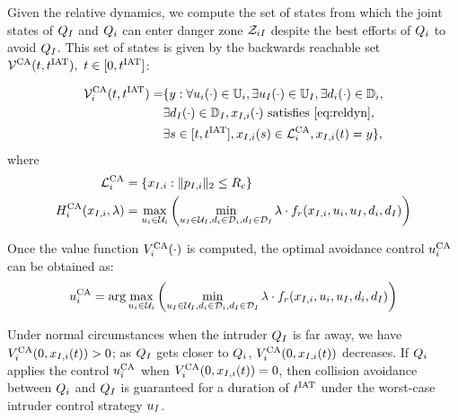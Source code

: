 Given the relative dynamics, we compute the set of states from which the joint states of $Q_{I}$ and $Q_i$ can enter danger zone $\mathcal{Z}_{iI}$ despite the best efforts of $Q_i$ to avoid $Q_{I}$. This set of states is given by the backwards reachable set $\mathcal{V}^{\text{CA}}(t, t^\text{IAT}),~ t \in [0, t^\text{IAT}]$:%

\begin{equation} \label{eqn:optAvoid}
\begin{aligned}
\brs^{\text{CA}}_{i}(t, \iat) = & \{y: \forall \ctrl_i(\cdot) \in \cfset_i, \exists \ctrl_\intr(\cdot) \in \cfset_\intr, \exists \dstb_i(\cdot) \in \dfset_i, \\
& \exists \dstb_\intr(\cdot) \in \dfset_\intr, \state_{\intr, i}(\cdot) \text{ satisfies \eqref{eq:reldyn}},\\
& \exists s \in [t, \iat], \state_{\intr, i}(s) \in \targetset^{\text{CA}}_{i}, \state_{\intr, i}(t) = y\},
\end{aligned}
\end{equation}
where 
\begin{equation}
\begin{aligned}
\mathcal{L}^{\text{CA}}_{i} &= \{x_{I, i}: \|p_{I, i}\|_2 \le R_c\} \\
H^{\text{CA}}_{i}(x_{I, i}, \lambda) &= \max_{u_i \in \mathcal{U}_i} \left( \min_{u_I \in \mathcal{U}_I, d_i \in \mathcal{D}_i, d_I \in \mathcal{D}_I} \lambda \cdot f_r(x_{I, i}, u_i, u_I, d_i, d_I) \right)
\end{aligned}
\end{equation}

Once the value function $V^{\text{CA}}_{i}(\cdot)$ is computed, the optimal avoidance control ${u^{\text{CA}}_{i}}$ can be obtained as:
\begin{equation} \label{eqn:optAvoidCtrl}
{\ctrl^{\text{CA}}_{i}} = \arg \max_{\ctrl_i \in \cset_i} \left( \min_{\ctrl_\intr \in \cset_\intr, \dstb_i \in \dset_i, \dstb_\intr \in \dset_\intr} \costate \cdot f_r(\state_{\intr, i}, \ctrl_i, \ctrl_\intr, \dstb_i, \dstb_\intr) \right)
\end{equation}

Under normal circumstances when the intruder $Q_{I}$ is far away, we have $V^{\text{CA}}_{i}(0, x_{I, i}(t)) > 0$; as $Q_{I}$ gets closer to $Q_i$, $V^{\text{CA}}_{i}(0, x_{I, i}(t))$ decreases. If $Q_i$ applies the control ${u^{\text{CA}}_{i}}$ when $V^{\text{CA}}_{i}(0, x_{I, i}(t)) = 0$, then collision avoidance between $Q_i$ and $Q_{I}$ is guaranteed for a duration of $t^\text{IAT}$ under the worst-case intruder control strategy $u_I$.

